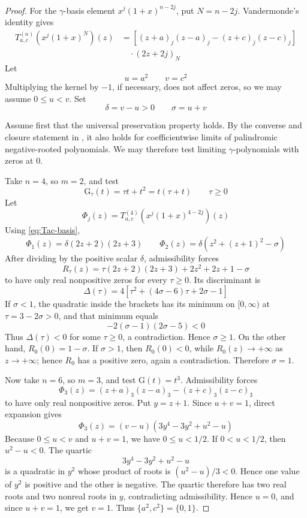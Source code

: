 \documentclass[a4paper,11pt,reqno]{amsart}
\numberwithin{equation}{section}
\theoremstyle{remark}
\newcommand{\Gpoly}{\mathrm{G}}     %
\begin{document}
\begin{proof}
For the \(\gamma\)-basis element \(x^j(1+x)^{n-2j}\), put \(N=n-2j\). Vandermonde's identity gives
\begin{equation}\label{eq:Tac-basis}
\begin{aligned}
  T_{a,c}^{(n)}
  \left(x^j(1+x)^N\right)(z)
  &=
  \left[
    (z+a)_j(z-a)_j
    -
    (z+c)_j(z-c)_j
  \right]  \\
  &\quad\cdot
  (2z+2j)_N 
\end{aligned}
\end{equation}
Let
\[
  u=a^2
  \qquad
  v=c^2
\]
Multiplying the kernel by \(-1\), if necessary, does not affect zeros, so we may assume \(0\leq u<v\). Set
\[
  \delta=v-u>0
  \qquad
  \sigma=u+v
\]

Assume first that the universal preservation property holds. By the converse and closure statement in , it also holds for coefficientwise limits of palindromic negative-rooted polynomials. We may therefore test limiting \(\gamma\)-polynomials with zeros at \(0\).

Take \(n=4\), so \(m=2\), and test
\[
  \Gpoly_\tau(t)=\tau t+t^2=t(\tau+t)
  \qquad \tau\geq0
\]
Let
\[
  \Phi_j(z)=T_{a,c}^{(4)}
  \left(x^j(1+x)^{4-2j}\right)(z)
\]
Using \eqref{eq:Tac-basis},
\[
  \Phi_1(z)=\delta(2z+2)(2z+3)
  \qquad
  \Phi_2(z)=\delta\left(z^2+(z+1)^2-\sigma\right)
\]
After dividing by the positive scalar \(\delta\), admissibility forces
\[
  R_\tau(z)=
  \tau(2z+2)(2z+3)+2z^2+2z+1-\sigma
\]
to have only real nonpositive zeros for every \(\tau\geq0\). Its discriminant is
\[
  \Delta(\tau)=
  4\left[
    \tau^2+(4\sigma-6)\tau+2\sigma-1
  \right]
\]
If \(\sigma<1\), the quadratic inside the brackets has its minimum on \([0,\infty)\) at \(\tau=3-2\sigma>0\), and that minimum equals
\[
  -2(\sigma-1)(2\sigma-5)<0
\]
Thus \(\Delta(\tau)<0\) for some \(\tau\geq0\), a contradiction. Hence \(\sigma\geq1\). On the other hand, \(R_0(0)=1-\sigma\). If \(\sigma>1\), then \(R_0(0)<0\), while \(R_0(z)\to+\infty\) as \(z\to+\infty\); hence \(R_0\) has a positive zero, again a contradiction. Therefore \(\sigma=1\).

Now take \(n=6\), so \(m=3\), and test \(\Gpoly(t)=t^3\). Admissibility forces
\[
  \Phi_3(z)=
  (z+a)_3(z-a)_3-(z+c)_3(z-c)_3
\]
to have only real nonpositive zeros. Put \(y=z+1\). Since \(u+v=1\), direct expansion gives
\[
  \Phi_3(z)
  =
  (v-u)\left(3y^4-3y^2+u^2-u\right)
\]
Because \(0\leq u<v\) and \(u+v=1\), we have \(0\leq u<1/2\). If \(0<u<1/2\), then \(u^2-u<0\). The quartic
\[
  3y^4-3y^2+u^2-u
\]
is a quadratic in \(y^2\) whose product of roots is \((u^2-u)/3<0\). Hence one value of \(y^2\) is positive and the other is negative. The quartic therefore has two real roots and two nonreal roots in \(y\), contradicting admissibility. Hence \(u=0\), and since \(u+v=1\), we get \(v=1\). Thus \(\{a^2,c^2\}=\{0,1\}\).


\end{proof}
\end{document}
